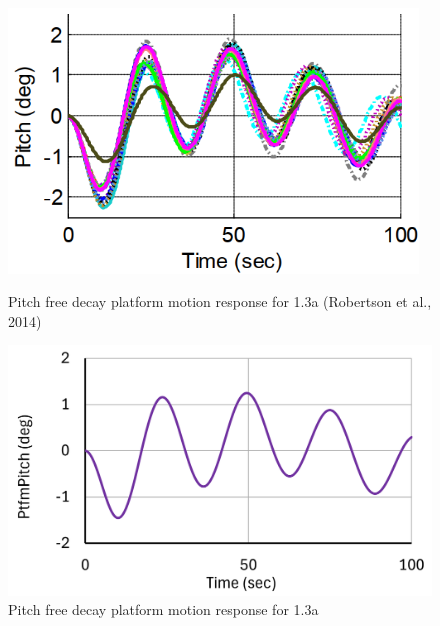 \documentclass[a4paper, 11pt]{article}
\begin{document}
\begin{figure}[H]
    \begin{minipage}{0.48\textwidth}
        \centering
        \includegraphics[width=0.97\textwidth]{1.3a_pitch.png}
        \caption{\small Pitch free decay platform motion response for 1.3a (Robertson et al., 2014)}
        \label{fig:1.3a_pitch}
    \end{minipage}
    \hfill
    \begin{minipage}{0.49\textwidth}
        \centering
        \includegraphics[width=1\textwidth]{1.3a_pitch_mine.png}
        \caption{\small Pitch free decay platform motion response for 1.3a}
        \label{fig:1.3a_pitch_mine}
    \end{minipage}
\end{figure}
\end{document}
